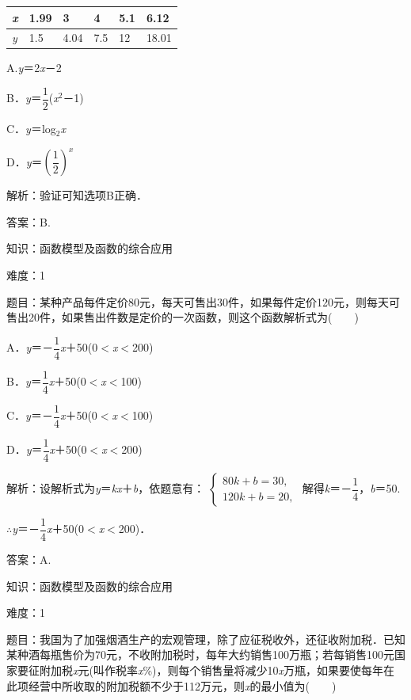 \documentclass{article} %
\begin{document}
\begin{tabular}{|p{0.2in}|p{0.4in}|p{0.4in}|p{0.3in}|p{0.3in}|p{0.4in}|} \hline
	\textit{x} & 1.99\textit{} & 3\textit{} & 4\textit{} & 5.1\textit{} & 6.12 \\ \hline
	\textit{y} & 1.5\textit{} & 4.04\textit{} & 7.5\textit{} & 12\textit{} & 18.01 \\ \hline
\end{tabular}

A.\textit{y}＝2\textit{x}－2   

B．\textit{y}＝$\dfrac{1}{2}$(\textit{x}${}^{2}$－1)

C．\textit{y}＝log${}_{2}$\textit{x}   

D．\textit{y}＝$(\dfrac{1}{2})^{x}$

解析：验证可知选项B正确．

答案：B.

知识：函数模型及函数的综合应用

难度：1

题目：某种产品每件定价80元，每天可售出30件，如果每件定价120元，则每天可售出20件，如果售出件数是定价的一次函数，则这个函数解析式为(　　)

A．\textit{y}＝－$\dfrac{1}{4}$\textit{x}＋50(0$\mathrm{<}$\textit{x}$\mathrm{<}$200)

B．\textit{y}＝$\dfrac{1}{4}$\textit{x}＋50(0$\mathrm{<}$\textit{x}$\mathrm{<}$100)

C．\textit{y}＝－$\dfrac{1}{4}$\textit{x}＋50(0$\mathrm{<}$\textit{x}$\mathrm{<}$100)

D．\textit{y}＝$\dfrac{1}{4}$\textit{x}＋50(0$\mathrm{<}$\textit{x}$\mathrm{<}$200)

解析：设解析式为\textit{y}＝\textit{kx}＋\textit{b}，依题意有：
$\left\{
\begin{array}{l}
80k+b=30,\\
120k+b=20,
\end{array}
\right.$
解得\textit{k}＝－$\dfrac{1}{4}$，\textit{b}＝50.

$\mathrm{\therefore}$\textit{y}＝－$\dfrac{1}{4}$\textit{x}＋50(0$\mathrm{<}$\textit{x}$\mathrm{<}$200)．

答案：A.

知识：函数模型及函数的综合应用

难度：1

题目：我国为了加强烟酒生产的宏观管理，除了应征税收外，还征收附加税．已知某种酒每瓶售价为70元，不收附加税时，每年大约销售100万瓶；若每销售100元国家要征附加税\textit{x}元(叫作税率\textit{x}\%)，则每个销售量将减少10\textit{x}万瓶，如果要使每年在此项经营中所收取的附加税额不少于112万元，则\textit{x}的最小值为(　　)
\end{document}
